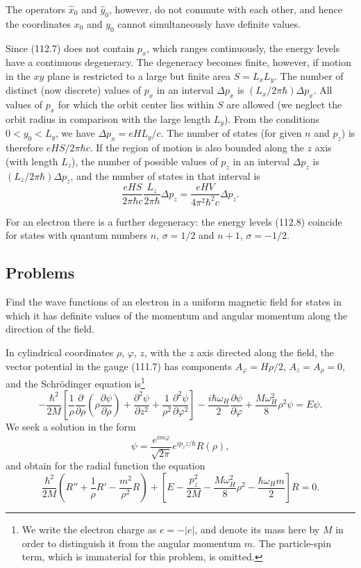 The operators $\hat x_0$ and $\hat y_0$, however, do not commute with each other, and hence the coordinates $x_0$ and $y_0$ cannot simultaneously have definite values.

Since (112.7) does not contain $p_x$, which ranges continuously, the energy levels have a continuous degeneracy. The degeneracy becomes finite, however, if motion in the $xy$ plane is restricted to a large but finite area $S=L_xL_y$. The number of distinct (now discrete) values of $p_x$ in an interval $\Delta p_x$ is $(L_x/2\pi\hbar)\Delta p_x$. All values of $p_x$ for which the orbit center lies within $S$ are allowed (we neglect the orbit radius in comparison with the large length $L_y$). From the conditions $0<y_0<L_y$, we have $\Delta p_x=eHL_y/c$. The number of states (for given $n$ and $p_z$) is therefore $eHS/2\pi\hbar c$. If the region of motion is also bounded along the $z$ axis (with length $L_z$), the number of possible values of $p_z$ in an interval $\Delta p_z$ is $(L_z/2\pi\hbar)\Delta p_z$, and the number of states in that interval is
\begin{equation}
 \frac{eHS}{2\pi\hbar c}\frac{L_z}{2\pi\hbar}\Delta p_z=\frac{eHV}{4\pi^2\hbar^2c}\Delta p_z.
 \tag{112.10}
\end{equation}

For an electron there is a further degeneracy: the energy levels (112.8) coincide for states with quantum numbers $n$, $\sigma=1/2$ and $n+1$, $\sigma=-1/2$.

\subsection*{Problems}

 Find the wave functions of an electron in a uniform magnetic field for states in which it has definite values of the momentum and angular momentum along the direction of the field.

\SolutionHeading In cylindrical coordinates $\rho$, $\varphi$, $z$, with the $z$ axis directed along the field, the vector potential in the gauge (111.7) has components $A_\varphi=H\rho/2$, $A_z=A_\rho=0$, and the Schrödinger equation is\footnote{We write the electron charge as $e=-|e|$, and denote its mass here by $M$ in order to distinguish it from the angular momentum $m$. The particle-spin term, which is immaterial for this problem, is omitted.}
\begin{equation}
 -\frac{\hbar^2}{2M}\left[\frac1\rho\frac\partial{\partial\rho}\left(\rho\frac{\partial\psi}{\partial\rho}\right)+\frac{\partial^2\psi}{\partial z^2}+\frac1{\rho^2}\frac{\partial^2\psi}{\partial\varphi^2}\right]-\frac{i\hbar\omega_H}{2}\frac{\partial\psi}{\partial\varphi}+\frac{M\omega_H^2}{8}\rho^2\psi=E\psi.
 \tag{1}
\end{equation}
We seek a solution in the form
\[
 \psi=\frac{e^{im\varphi}}{\sqrt{2\pi}}e^{ip_zz/\hbar}R(\rho),
\]
and obtain for the radial function the equation
\[
 \frac{\hbar^2}{2M}\left(R''+\frac1\rho R'-\frac{m^2}{\rho^2}R\right)+\left[E-\frac{p_z^2}{2M}-\frac{M\omega_H^2}{8}\rho^2-\frac{\hbar\omega_Hm}{2}\right]R=0.
\]

